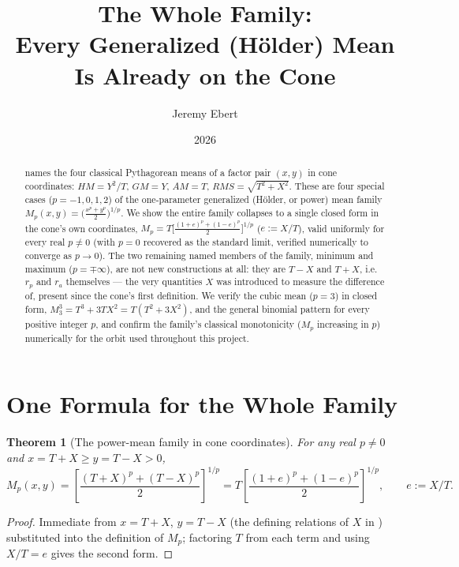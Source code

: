 \documentclass[12pt]{amsart}
\title[The Whole Family]{The Whole Family:\\
Every Generalized (H\"older) Mean Is Already on the Cone}
\author{Jeremy Ebert}
\date{2026}
\theoremstyle{plain}
\newtheorem{theorem}{Theorem}[section]
\theoremstyle{remark}
\begin{document}
\maketitle

\begin{abstract}
\cite{Ebert2026FourMeans} names the four classical Pythagorean means of a factor pair $(x,y)$ in cone coordinates: $HM=Y^2/T$, $GM=Y$, $AM=T$, $RMS=\sqrt{T^2+X^2}$. These are four special cases ($p=-1,0,1,2$) of the one-parameter generalized (H\"older, or power) mean family $M_p(x,y)=\big(\tfrac{x^p+y^p}{2}\big)^{1/p}$. We show the entire family collapses to a single closed form in the cone's own coordinates, $M_p=T\big[\tfrac{(1+e)^p+(1-e)^p}{2}\big]^{1/p}$ ($e:=X/T$), valid uniformly for every real $p\ne0$ (with $p=0$ recovered as the standard limit, verified numerically to converge as $p\to0$). The two remaining named members of the family, minimum and maximum ($p=\mp\infty$), are not new constructions at all: they are $T-X$ and $T+X$, i.e.\ $r_p$ and $r_a$ themselves --- the very quantities $X$ was introduced to measure the difference of, present since the cone's first definition. We verify the cubic mean ($p=3$) in closed form, $M_3^3=T^3+3TX^2=T(T^2+3X^2)$, and the general binomial pattern for every positive integer $p$, and confirm the family's classical monotonicity ($M_p$ increasing in $p$) numerically for the orbit used throughout this project.
\end{abstract}

\section{One Formula for the Whole Family}

\begin{theorem}[The power-mean family in cone coordinates]\label{thm:general}
For any real $p\ne0$ and $x=T+X\ge y=T-X>0$,
\begin{equation}
M_p(x,y)=\left[\frac{(T+X)^p+(T-X)^p}{2}\right]^{1/p}=T\left[\frac{(1+e)^p+(1-e)^p}{2}\right]^{1/p}, \qquad e:=X/T. \tag{1}
\end{equation}
\end{theorem}

\begin{proof}
Immediate from $x=T+X$, $y=T-X$ (the defining relations of $X$ in \cite{Ebert2026Table}) substituted into the definition of $M_p$; factoring $T$ from each term and using $X/T=e$ gives the second form.
\end{proof}
\end{document}
